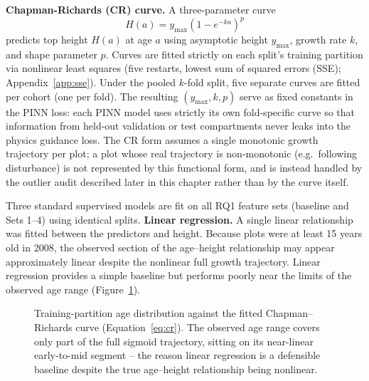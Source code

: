 \textbf{Chapman-Richards (CR) curve.} A three-parameter curve
\begin{equation}
H(a) = y_{\max}\left(1-e^{-ka}\right)^{p}
\label{eq:cr}
\end{equation}
predicts top height $H(a)$ at age $a$ using asymptotic height $y_{\max}$, growth rate $k$, and shape parameter $p$. Curves are fitted strictly on each split's training partition via nonlinear least squares (five restarts, lowest sum of squared errors (SSE); Appendix~\ref{app:sse}). Under the pooled $k$-fold split, five separate curves are fitted per cohort (one per fold). The resulting $(y_{\max}, k, p)$ serve as fixed constants in the PINN loss: each PINN model uses strictly its own fold-specific curve so that information from held-out validation or test compartments never leaks into the physics guidance loss. The CR form assumes a single monotonic growth trajectory per plot; a plot whose real trajectory is non-monotonic (e.g.\ following disturbance) is not represented by this functional form, and is instead handled by the outlier audit described later in this chapter rather than by the curve itself. %

Three standard supervised models are fit on all RQ1 feature sets (baseline and Sets 1–4) using identical splits.
\textbf{Linear regression.} A single linear relationship was fitted between the predictors and height. Because plots were at least 15 years old in 2008, the observed section of the age--height relationship may appear approximately linear despite the nonlinear full growth trajectory. Linear regression provides a simple baseline but performs poorly near the limits of the observed age range (Figure~\ref{fig:age-linearity}).

\begin{figure}[!htbp]
\centering
{}
\caption{Training-partition age distribution against the fitted Chapman--Richards curve
(Equation~\ref{eq:cr}). The observed age range covers only part of the full sigmoid trajectory,
sitting on its near-linear early-to-mid segment -- the reason linear regression is a defensible
baseline despite the true age--height relationship being nonlinear.}
\label{fig:age-linearity}
\end{figure}

